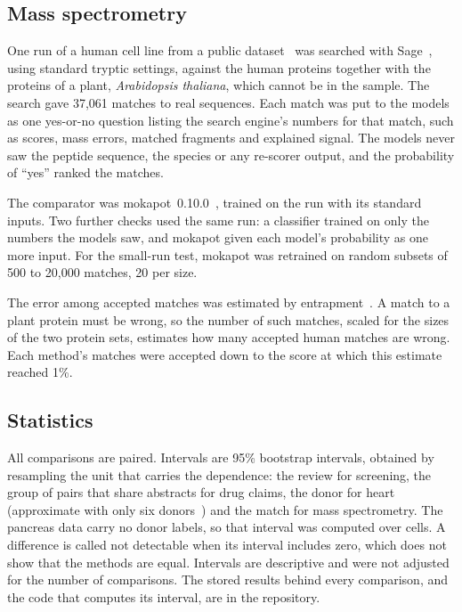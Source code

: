 \subsection{Mass spectrometry}
One run of a human cell line from a public dataset~\cite{chick} was searched with Sage~\cite{sage}, using standard tryptic settings, against the human proteins together with the proteins of a plant, \emph{Arabidopsis thaliana}, which cannot be in the sample. The search gave 37,061 matches to real sequences. Each match was put to the models as one yes-or-no question listing the search engine's numbers for that match, such as scores, mass errors, matched fragments and explained signal. The models never saw the peptide sequence, the species or any re-scorer output, and the probability of ``yes'' ranked the matches.

The comparator was mokapot~0.10.0~\cite{mokapot}, trained on the run with its standard inputs. Two further checks used the same run: a classifier trained on only the numbers the models saw, and mokapot given each model's probability as one more input. For the small-run test, mokapot was retrained on random subsets of 500 to 20,000 matches, 20 per size.

The error among accepted matches was estimated by entrapment~\cite{wen}. A match to a plant protein must be wrong, so the number of such matches, scaled for the sizes of the two protein sets, estimates how many accepted human matches are wrong. Each method's matches were accepted down to the score at which this estimate reached 1\%.

\subsection{Statistics}
All comparisons are paired. Intervals are 95\% bootstrap intervals, obtained by resampling the unit that carries the dependence: the review for screening, the group of pairs that share abstracts for drug claims, the donor for heart (approximate with only six donors~\cite{field2007}) and the match for mass spectrometry. The pancreas data carry no donor labels, so that interval was computed over cells. A difference is called not detectable when its interval includes zero, which does not show that the methods are equal. Intervals are descriptive and were not adjusted for the number of comparisons. The stored results behind every comparison, and the code that computes its interval, are in the repository.
